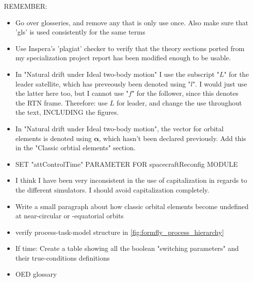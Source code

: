 REMEMBER:
\begin{itemize}
    \item Go over glosseries, and remove any that is only use once. Also make sure that 'gls' is used consistently for the same terms
    \item Use Inspera's 'plagiat' checker to verify that the theory sections ported from my specialization project report has been modified enough to be usable. 
    \item In "Natural drift under Ideal two-body motion" I use the subscript "$L$" for the leader satellite, which has preveously been denoted using "$l$". I would just use the latter here too, but I cannot use "$f$" for the follower, since this denotes the RTN frame. Therefore: use $L$ for leader, and change the use throughout the text, INCLUDING the figures.
    \item In "Natural drift under Ideal two-body motion", the vector for orbital elements is denoted using $\boldsymbol{\alpha}$, which hasn't been declared previously. Add this in the "Classic orbtial elements" section. 
    \item SET "attControlTime" PARAMETER FOR spacecraftReconfig MODULE
    \item I think I have been very inconsistent in the use of capitalization in regards to the different simulators. I should avoid capitalization completely. 
    \item Write a small paragraph about how classic orbital elements become undefined at near-circular or -equatorial orbits
    \item verify process-task-model structure in \ref{fig:formfly_process_hierarchy}
    \item If time: Create a table showing all the boolean "switching parameters" and their true-conditions definitions 
    \item OED glossary
\end{itemize}